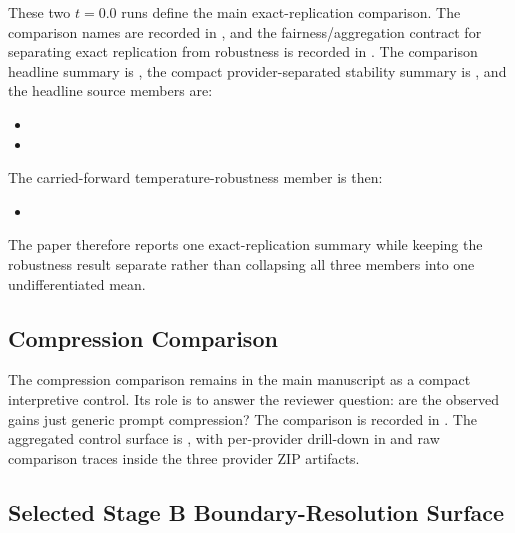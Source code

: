 \documentclass[11pt,a4paper]{article}
\begin{document}
These two \(t=0.0\) runs define the main exact-replication comparison. The
comparison names are recorded in
, and
the fairness/aggregation contract for separating exact replication from
robustness is recorded in
. The
comparison headline summary is
,
the compact provider-separated stability summary is
,
and the headline source members are:
\begin{itemize}
  \item {}
  \item {}
\end{itemize}
The carried-forward temperature-robustness member is then:
\begin{itemize}
  \item {}
\end{itemize}
The paper therefore reports one exact-replication summary while keeping the
robustness result separate rather than collapsing all three members into one
undifferentiated mean.

\subsection{Compression Comparison}

The compression comparison remains in the main manuscript as a compact
interpretive control. Its role is to answer the reviewer question: are the
observed gains just generic prompt compression? The comparison is recorded in
. The
aggregated control surface is
,
with per-provider drill-down in
and raw comparison traces inside the three provider ZIP artifacts.

\subsection{Selected Stage B Boundary-Resolution Surface}
\end{document}
